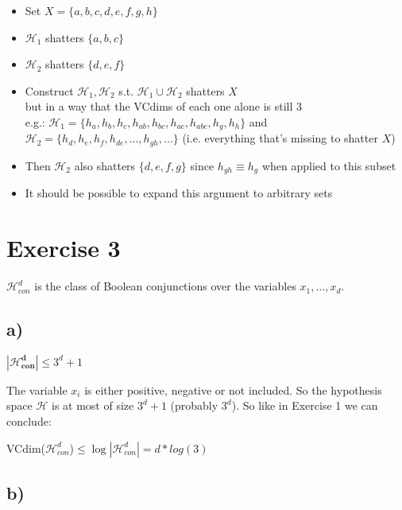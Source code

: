 \documentclass{article}
\begin{document}
		\begin{itemize}
			\item Set $X=\{a,b,c,d,e,f,g,h\}$
			\item $\mathcal{H}_1$ shatters $\{a,b,c\}$
			\item $\mathcal{H}_2$ shatters $\{d,e,f\}$
			\item Construct $\mathcal{H}_1,\mathcal{H}_2$ s.t. $\mathcal{H}_1\cup \mathcal{H}_2$ shatters $X$
			\\ but in a way that the VCdims of each one alone is still 3 
			\\ e.g.: $\mathcal{H}_1=\{h_a,h_b,h_c,h_{ab},h_{bc},h_{ac},h_{abc},h_g,h_h\}$
			and $\mathcal{H}_2=\{h_d,h_e,h_f,h_{de},...,h_{gh},...\}$ (i.e. everything that's missing to shatter $X$) 
			\item Then $\mathcal{H}_2$ also shatters $\{d,e,f,g\}$ since $h_{gh} \equiv h_g$ when applied to this subset
			\item It should be possible to expand this argument to arbitrary sets
		\end{itemize}	


\section*{Exercise 3}
$\mathcal{H}^d_{con}$ is the class of Boolean conjunctions over the variables
$x_1,\ldots,x_d$.
\subsection*{a)}
$\mathbf{|\mathcal{H}_{con}^d|}\leq 3^d + 1$



The variable $x_i$ is either positive, negative or not included. So the
hypothesis space $\mathcal{H}$ is at most of size $3^d + 1$ (probably $3^d$). So
like in Exercise 1 we can conclude:

VCdim($\mathcal{H}_{con}^d$)$\leq \log|\mathcal{H}_{con}^d| = d*log(3)$

\subsection*{b)}
% 
\end{document}
